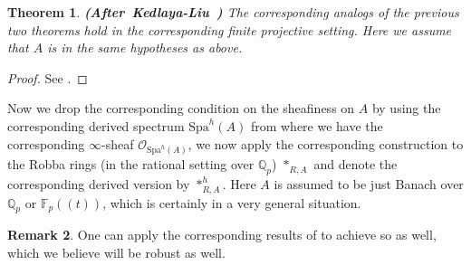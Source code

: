 \documentclass[12pt]{amsart}
\newtheorem{theorem}{Theorem}[section]
\theoremstyle{definition}
\newtheorem{remark}[theorem]{Remark}
\numberwithin{equation}{section}
\begin{document}
\begin{theorem}\mbox{\bf{(After Kedlaya-Liu \cite[Corollary 4.6.2]{KL2})}}
The corresponding analogs of the previous two theorems hold in the corresponding finite projective setting. Here we assume that $A$ is in the same hypotheses as above.	
\end{theorem}

\begin{proof}
See \cite[Corollary 4.6.2]{KL2}.	
\end{proof}











\indent Now we drop the corresponding condition on the sheafiness on $A$ by using the corresponding derived spectrum $\mathrm{Spa}^h(A)$ from \cite{BK1} where we have the corresponding $\infty$-sheaf $\mathcal{O}_{\mathrm{Spa}^h(A)}$, we now apply the corresponding construction to the Robba rings (in the rational setting over $\mathbb{Q}_p$) $*_{R,A}$ and denote the corresponding derived version by $*^h_{R,A}$. Here $A$ is assumed to be just Banach over $\mathbb{Q}_p$ or $\mathbb{F}_p((t))$, which is certainly in a very general situation.


\begin{remark}
One can apply the corresponding results of \cite{CS} to achieve so as well, which we believe will be robust as well.	
\end{remark}


\end{document}
